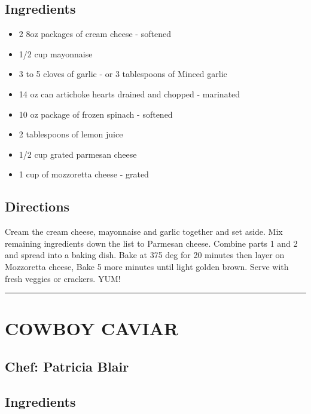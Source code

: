 \documentclass[
]{book}
\providecommand{\tightlist}{%
  \setlength{\itemsep}{0pt}\setlength{\parskip}{0pt}}
\begin{document}
\hypertarget{ingredients}{%
\subsection*{Ingredients}\label{ingredients}}


\begin{itemize}
\tightlist
\item
  2 8oz packages of cream cheese - softened
\item
  1/2 cup mayonnaise
\item
  3 to 5 cloves of garlic - or 3 tablespoons of Minced garlic
\item
  14 oz can artichoke hearts drained and chopped - marinated
\item
  10 oz package of frozen spinach - softened
\item
  2 tablespoons of lemon juice
\item
  1/2 cup grated parmesan cheese
\item
  1 cup of mozzoretta cheese - grated
\end{itemize}

\hypertarget{directions}{%
\subsection*{Directions}\label{directions}}


Cream the cream cheese, mayonnaise and garlic together and set aside.
Mix remaining ingredients down the list to Parmesan cheese.
Combine parts 1 and 2 and spread into a baking dish.
Bake at 375 deg for 20 minutes then layer on Mozzoretta cheese,
Bake 5 more minutes until light golden brown.
Serve with fresh veggies or crackers.
YUM!

\begin{center}\rule{0.5\linewidth}{0.5pt}\end{center}

\hypertarget{cowboy-caviar}{%
\section*{COWBOY CAVIAR}\label{cowboy-caviar}}


\hypertarget{chef-patricia-blair}{%
\subsection*{Chef: Patricia Blair}\label{chef-patricia-blair}}


\hypertarget{ingredients-1}{%
\subsection*{Ingredients}\label{ingredients-1}}
\end{document}
